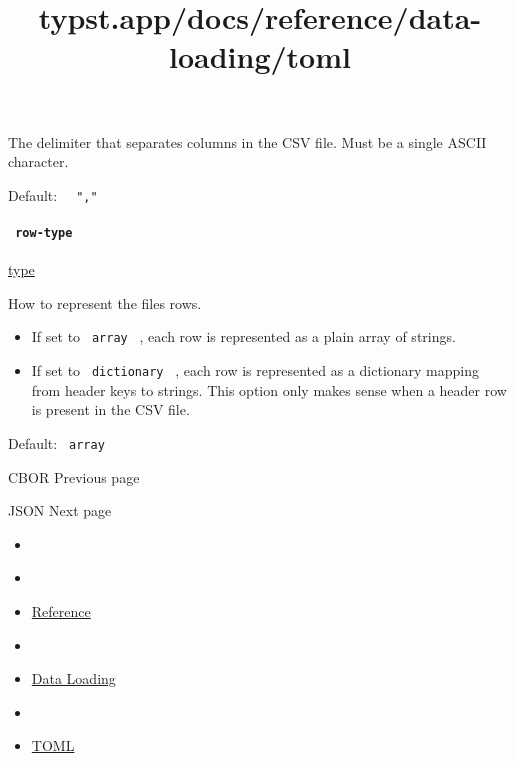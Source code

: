 The delimiter that separates columns in the CSV file. Must be a single
ASCII character.

Default: \texttt{\ }{\texttt{\ ","\ }}\texttt{\ }

\paragraph{\texorpdfstring{\texttt{\ row-type\ }}{ row-type }}\label{definitions-decode-row-type}

\href{/docs/reference/foundations/type/}{type}

How to represent the file\textquotesingle s rows.

\begin{itemize}
\tightlist
\item
  If set to \texttt{\ array\ } , each row is represented as a plain
  array of strings.
\item
  If set to \texttt{\ dictionary\ } , each row is represented as a
  dictionary mapping from header keys to strings. This option only makes
  sense when a header row is present in the CSV file.
\end{itemize}

Default: \texttt{\ array\ }

\href{/docs/reference/data-loading/cbor/}{\pandocbounded{}}

{ CBOR } { Previous page }

\href{/docs/reference/data-loading/json/}{\pandocbounded{}}

{ JSON } { Next page }


\title{typst.app/docs/reference/data-loading/toml}

\begin{itemize}
\tightlist
\item
  \href{/docs}{}
\item
  
\item
  \href{/docs/reference/}{Reference}
\item
  
\item
  \href{/docs/reference/data-loading/}{Data Loading}
\item
  
\item
  \href{/docs/reference/data-loading/toml/}{TOML}
\end{itemize}

